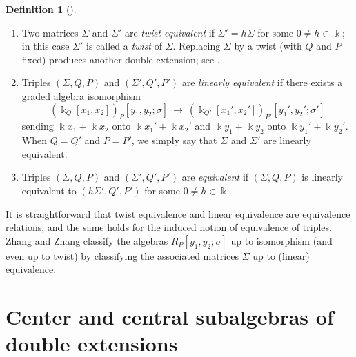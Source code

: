 \documentclass{amsart}
\theoremstyle{definition}
\newtheorem{definition}[theorem]{Definition}
\theoremstyle{remark}
\numberwithin{equation}{section}
\begin{document}
\begin{definition}[{\cite[Definition 3.4]{ZhangZhang2009}}]
\begin{enumerate}
    \item[\rm (i)] Two matrices $\Sigma$ and $\Sigma'$ are \emph{twist equivalent} if $\Sigma'=h\Sigma$ for some $0\neq h\in\Bbbk$; in this case $\Sigma'$ is called a \emph{twist} of $\Sigma$. Replacing $\Sigma$ by a twist (with $Q$ and $P$ fixed) produces another double extension; see \cite[Lemma 3.3(b)]{ZhangZhang2009}.
    \item[\rm (ii)] Triples $(\Sigma,Q,P)$ and $(\Sigma',Q',P')$ are \emph{linearly equivalent} if there exists a graded algebra isomorphism
    \[
    (\Bbbk_Q[x_1,x_2])_P[y_1,y_2;\sigma]\ \longrightarrow\ (\Bbbk_{Q'}[x_1',x_2'])_{P'}[y_1',y_2';\sigma']
    \]
    sending $\Bbbk x_1+\Bbbk x_2$ onto $\Bbbk x_1'+\Bbbk x_2'$ and $\Bbbk y_1+\Bbbk y_2$ onto $\Bbbk y_1'+\Bbbk y_2'$.
    When $Q=Q'$ and $P=P'$, we simply say that $\Sigma$ and $\Sigma'$ are linearly equivalent.
    \item[\rm (iii)] Triples $(\Sigma,Q,P)$ and $(\Sigma',Q',P')$ are \emph{equivalent} if $(\Sigma,Q,P)$ is linearly equivalent to $(h\Sigma',Q',P')$ for some $0\neq h\in\Bbbk$.
\end{enumerate}
\end{definition}

It is straightforward that twist equivalence and linear equivalence are equivalence relations, and the same holds for the induced notion of equivalence of triples. Zhang and Zhang \cite{ZhangZhang2009} classify the algebras $R_P[y_1,y_2;\sigma]$ up to isomorphism (and even up to twist) by classifying the associated matrices $\Sigma$ up to (linear) equivalence.


\section{Center and central subalgebras of double extensions}\label{DAThreegenerators}
\end{document}
